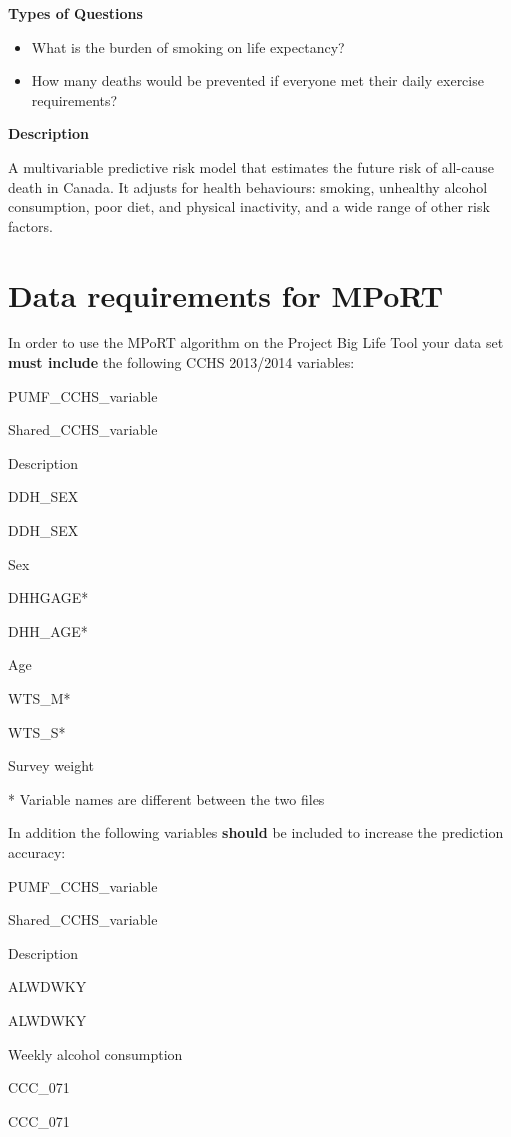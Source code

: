 \documentclass[]{book}
\providecommand{\tightlist}{%
  \setlength{\itemsep}{0pt}\setlength{\parskip}{0pt}}
\begin{document}
\textbf{Types of Questions}

\begin{itemize}
\tightlist
\item
  What is the burden of smoking on life expectancy?
\item
  How many deaths would be prevented if everyone met their daily exercise requirements?
\end{itemize}

\textbf{Description}

A multivariable predictive risk model that estimates the future risk of all-cause death in Canada. It adjusts for health behaviours: smoking, unhealthy alcohol consumption, poor diet, and physical inactivity, and a wide range of other risk factors.

\hypertarget{data-requirements-for-mport}{%
\section{Data requirements for MPoRT}\label{data-requirements-for-mport}}

In order to use the MPoRT algorithm on the Project Big Life Tool your data set \textbf{must include} the following CCHS 2013/2014 variables:

PUMF\_CCHS\_variable

Shared\_CCHS\_variable

Description

DDH\_SEX

DDH\_SEX

Sex

DHHGAGE*

DHH\_AGE*

Age

WTS\_M*

WTS\_S*

Survey weight

* Variable names are different between the two files

In addition the following variables \textbf{should} be included to increase the prediction accuracy:

PUMF\_CCHS\_variable

Shared\_CCHS\_variable

Description

ALWDWKY

ALWDWKY

Weekly alcohol consumption

CCC\_071

CCC\_071
\end{document}
